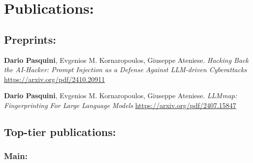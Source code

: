 \documentclass[margin, 10pt]{article} %
\begin{document}
\noindent\section*{Publications:}

\subsection*{Preprints:}
\vspace{.5cm}
\let\oldsection\section
\renewcommand{\section}[2]{}
\begin{thebibliography}{99}
\setcounter{enumiv}{7} 
	
	
	\textbf{Dario Pasquini},  Evgenios M. Kornaropoulos, Giuseppe Ateniese. \textit{Hacking Back the AI-Hacker: Prompt Injection as a Defense Against LLM-driven Cyberattacks} \url{https://arxiv.org/pdf/2410.20911}
	
	\textbf{Dario Pasquini},  Evgenios M. Kornaropoulos, Giuseppe Ateniese. \textit{LLMmap: Fingerprinting For Large Language Models} \url{https://arxiv.org/pdf/2407.15847}

 \end{thebibliography}


\ifml
\subsection*{Top-tier publications:}
\vspace{.5cm}
\else
\subsubsection{Main:}
\fi
\end{document}

